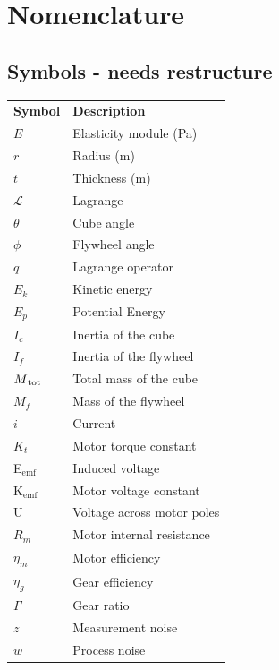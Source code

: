 \documentclass[a4paper,11pt]{kth-mag}
\newcommand{\textunderscript}[1]{$_{\text{#1}}$}
\begin{document}



\cleardoublepage
{}
\printindex
\tableofcontents*

\cleardoublepage
\chapter*{Nomenclature}
\section*{Symbols - needs restructure}
\noindent{}\begin{tabular}{@{}p{2.5cm}l}
\textbf{Symbol} 	& \textbf{Description} \vspace{.5em} \\
$E$ 		& Elasticity module (Pa) \\
$r$		& Radius (m) \\
$t$		& Thickness (m) \\
$\mathcal{L}$			& Lagrange \\
$\theta$		& Cube angle\\
$\phi$		& Flywheel angle \\
$q$			& Lagrange operator \\
$E_k	$		& Kinetic energy \\
$E_p$		& Potential Energy \\
$I_c$		& Inertia of the cube\\
$I_f$		& Inertia of the flywheel\\
$M\textsubscript{tot}$		& Total mass of the cube\\
$M_f$		& Mass of the flywheel \\
$i$			& Current\\
$K_t$		& Motor torque constant\\
E\textunderscript{emf} 	& Induced voltage \\
K\textunderscript{emf} 	& Motor voltage constant \\
U			& Voltage across motor poles\\
$R_m	$		& Motor internal resistance \\
$\eta_m$		& Motor efficiency\\	
$\eta_g$		& Gear efficiency \\
$\Gamma$		& Gear ratio\\
$z$			& Measurement noise \\
$w$			& Process noise \\

\end{tabular}
\clearpage
\end{document}
